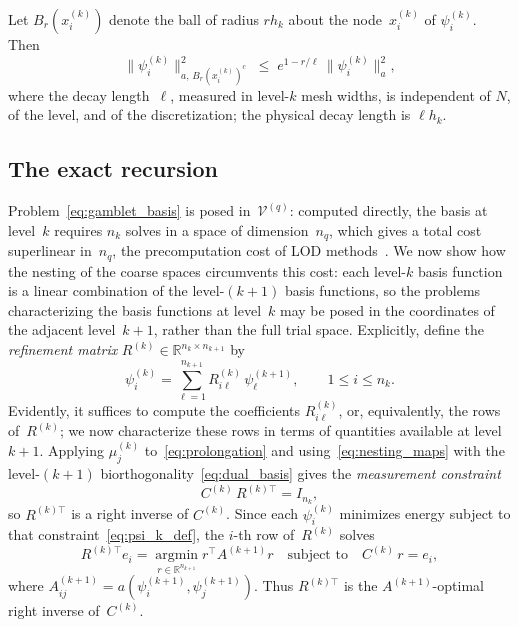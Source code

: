 \begin{theorem}\label{thm:energy_decay}
  Let $B_r(x^{(k)}_i)$ denote the ball of radius $r h_k$ about the
  node~$x^{(k)}_i$ of $\psi^{(k)}_i$.  Then
  \begin{equation}\label{eq:energy_decay}
    \|\psi^{(k)}_i\|_{a,\, B_r(x^{(k)}_i)^c}^2
    \;\leq\;
    e^{1 - r/\ell}\,\|\psi^{(k)}_i\|_a^2 ,
  \end{equation}
  where the decay length~$\ell$, measured in level-$k$ mesh widths, is
  independent of $N$, of the level, and of the discretization; the physical
  decay length is $\ell h_k$.
\end{theorem}

\subsection{The exact recursion}
\label{sec:background:oaw}

Problem~\eqref{eq:gamblet_basis} is posed in~$\mathcal{V}^{(q)}$: computed
directly, the basis at level~$k$ requires $n_k$ solves in a space of
dimension~$n_q$, which gives a total cost superlinear in~$n_q$, the
precomputation cost of LOD
methods~\cite{hauck2022multiresolutionlocalizedorthogonaldecomposition}.
We now show how the nesting of the coarse spaces circumvents this cost:
each level-$k$ basis function is a linear combination of the level-$(k+1)$
basis functions, so the problems characterizing the basis functions at
level~$k$ may be posed in the coordinates of the adjacent level~$k+1$,
rather than the full trial space.  Explicitly, define the
\emph{refinement matrix} $R^{(k)} \in \mathbb{R}^{n_k \times n_{k+1}}$ by
\begin{equation}\label{eq:prolongation}
  \psi^{(k)}_i = \sum_{\ell=1}^{n_{k+1}} R^{(k)}_{i\ell}\,\psi^{(k+1)}_\ell,
  \qquad 1 \leq i \leq n_k .
\end{equation}
Evidently, it suffices to compute the coefficients $R^{(k)}_{i\ell}$, or,
equivalently, the rows of~$R^{(k)}$; we now characterize these rows in
terms of quantities available at level~$k+1$.  Applying $\mu^{(k)}_j$
to~\eqref{eq:prolongation} and using~\eqref{eq:nesting_maps} with the
level-$(k+1)$ biorthogonality~\eqref{eq:dual_basis} gives the
\emph{measurement constraint}
\begin{equation}\label{eq:measurement_constraint}
  C^{(k)}\,R^{(k)\top} = I_{n_k} ,
\end{equation}
so $R^{(k)\top}$ is a right inverse of $C^{(k)}$.  Since each $\psi^{(k)}_i$
minimizes energy subject to that constraint~\eqref{eq:psi_k_def}, the $i$-th
row of~$R^{(k)}$ solves
\begin{equation}\label{eq:R_minimization}
  R^{(k)\top} e_i
  = \operatorname*{argmin}_{r \in \mathbb{R}^{n_{k+1}}} r^\top A^{(k+1)} r
  \quad \text{subject to} \quad C^{(k)}\,r = e_i ,
\end{equation}
where $A^{(k+1)}_{ij} = a(\psi^{(k+1)}_i, \psi^{(k+1)}_j)$.  Thus $R^{(k)\top}$
is the $A^{(k+1)}$-optimal right inverse of~$C^{(k)}$.

